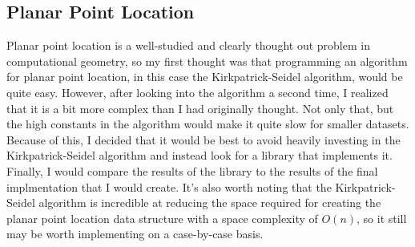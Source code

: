 \documentclass{article}
\begin{document}
\subsection{Planar Point Location}
Planar point location is a well-studied and clearly
thought out problem in computational geometry, so my first
thought was that programming an algorithm for planar point location,
in this case the Kirkpatrick-Seidel algorithm, would be quite easy.
However, after looking into the algorithm a second time, I realized
that it is a bit more complex than I had originally thought.
Not only that, but the high constants in the algorithm would make
it quite slow for smaller datasets. Because of this, I decided that
it would be best to avoid heavily investing in the Kirkpatrick-Seidel
algorithm and instead look for a library that implements it. Finally,
I would compare the results of the library to the results of the
final implmentation that I would create. It's also worth noting that 
the Kirkpatrick-Seidel algorithm is incredible at reducing the space
required for creating the planar point location data structure with a
space complexity of $O(n)$, so it still may be worth implementing on a 
case-by-case basis.
\end{document}
